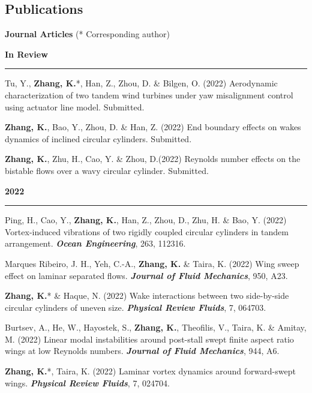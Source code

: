 \documentclass[10pt]{article}
\begin{document}
\subsection*{Publications}
{\bf \color{Blue}Journal Articles} (*  Corresponding author)
{\small
\begin{etaremune}
 \item [] {\bf \color{Blue} In Review \rule{13.8cm}{0.2mm}} 

 \item Tu, Y., \textbf{Zhang, K.}*, Han, Z., Zhou, D. \& Bilgen, O. (2022) Aerodynamic characterization of two tandem wind turbines under yaw misalignment control using actuator line model. Submitted.
 
 \item \textbf{Zhang, K.}, Bao, Y., Zhou, D. \& Han, Z. (2022) End boundary effects on wakes dynamics of inclined circular cylinders. Submitted.
 
 \item \textbf{Zhang, K.}, Zhu, H., Cao, Y. \& Zhou, D.(2022) Reynolds number effects on the bistable flows over a wavy circular cylinder. Submitted.



 
 \item [] {\bf \color{Blue} 2022 \rule{14.8cm}{0.2mm}}
 
 \item Ping, H., Cao, Y., \textbf{Zhang, K.}, Han, Z., Zhou, D., Zhu, H. \& Bao, Y. (2022) Vortex-induced vibrations of two rigidly coupled circular cylinders in tandem arrangement. \textit{\textbf{Ocean Engineering}}, 263, 112316. 
 
 \item Marques Ribeiro, J. H., Yeh, C.-A., \textbf{Zhang, K.} \& Taira, K. (2022) Wing sweep effect on laminar separated flows.  \textit{\textbf{Journal of Fluid Mechanics}}, 950, A23. 

 \item \textbf{Zhang, K.}* \& Haque, N. (2022) Wake interactions between two side-by-side circular cylinders of uneven size.  \textit{\textbf{Physical Review Fluids}}, 7, 064703.

  \item Burtsev, A., He, W., Hayostek, S., \textbf{Zhang, K.}, Theofilis, V., Taira, K. \& Amitay, M. (2022) Linear modal instabilities around post-stall swept finite aspect ratio wings at low Reynolds numbers. \textit{\textbf{Journal of Fluid Mechanics}}, 944, A6.

  \item \textbf{Zhang, K.}*, Taira, K. (2022) Laminar vortex dynamics around forward-swept wings.  \textit{\textbf{Physical Review Fluids}}, 7, 024704.


\end{etaremune}}
\end{document}
